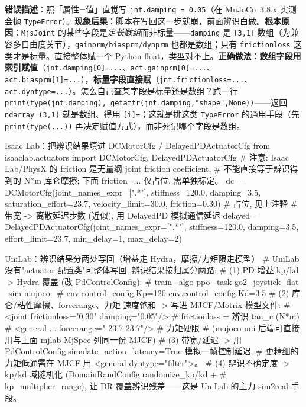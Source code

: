\begin{pitfall}
\textbf{错误描述}：照「属性=值」直觉写 \verb|jnt.damping = 0.05|（在 MuJoCo~3.8.x 实测会抛 \verb|TypeError|）。\textbf{现象后果}：脚本在写回这一步就崩，前面辨识白做。\textbf{根本原因}：\verb|MjsJoint| 的某些字段是\emph{定长数组}而非标量——\verb|damping| 是 \verb|[3,1]| 数组（为兼容多自由度关节），\verb|gainprm/biasprm/dynprm| 也都是数组；只有 \verb|frictionloss| 这类才是标量。直接整体赋一个 Python float，类型对不上。\textbf{正确做法}：\textbf{数组字段用索引赋值}（\verb|jnt.damping[0]=...|、\verb|act.gainprm[0]=...|、\verb|act.biasprm[1]=...|），\textbf{标量字段直接赋}（\verb|jnt.frictionloss=...|、\verb|act.dyntype=...|）。怎么自己查某字段是标量还是数组？跑一行 \verb|print(type(jnt.damping), getattr(jnt.damping,"shape",None))|——返回 \verb|ndarray (3,1)| 就是数组、得用 \verb|[i]=|；这就是排这类 \verb|TypeError| 的通用手段（先 \verb|print(type(...))| 再决定赋值方式），而非死记哪个字段是数组。
\end{pitfall}

\begin{codebox}[Python]{Isaac Lab：把辨识结果填进 DCMotorCfg / DelayedPDActuatorCfg}
from isaaclab.actuators import DCMotorCfg, DelayedPDActuatorCfg
# 注意: Isaac Lab/PhysX 的 friction 是无量纲 joint friction coefficient,
# 不能直接等于辨识得到的 N*m 库仑摩擦; 下面 friction=... 仅占位, 需单独标定。
dc = DCMotorCfg(joint_names_expr=[".*"], stiffness=120.0, damping=3.5,
                saturation_effort=23.7, velocity_limit=30.0,
                friction=0.30)                          # 占位, 见上注释
# 带宽 -> 离散延迟步数 (近似), 用 DelayedPD 模拟通信延迟
delayed = DelayedPDActuatorCfg(joint_names_expr=[".*"],
                stiffness=120.0, damping=3.5, effort_limit=23.7,
                min_delay=1, max_delay=2)
\end{codebox}

\begin{codebox}[Python]{UniLab：辨识结果分两处写回（增益走 Hydra，摩擦/力矩限走模型）}
# UniLab 没有"actuator 配置类"可整体写回, 辨识结果按归属分两路:
# (1) PD 增益 kp/kd -> Hydra 覆盖 (改 PdControlConfig):
#   train --algo ppo --task go2_joystick_flat --sim mujoco \
#       env.control_config.Kp=120 env.control_config.Kd=3.5
# (2) 库仑/粘性摩擦、forcerange、力矩-速度饱和 -> 写进 MJCF/Motrix 模型文件:
#   <joint frictionloss="0.30" damping="0.05"/>      # frictionloss = 辨识 tau_c (N*m)
#   <general ... forcerange="-23.7 23.7"/>           # 力矩硬限
#   (mujoco-uni 后端可直接用与上面 mjlab MjSpec 列同一份 MJCF)
# (3) 带宽/延迟 -> 用 PdControlConfig.simulate_action_latency=True 模拟一帧控制延迟,
#     更精细的力矩低通需在 MJCF 用 <general dyntype="filter">。
# (4) 辨识不确定度 -> kp/kd 域随机化 (DomainRandConfig.randomize_kp/kd +
#     kp_multiplier_range), 让 DR 覆盖辨识残差——这是 UniLab 的主力 sim2real 手段。
\end{codebox}

